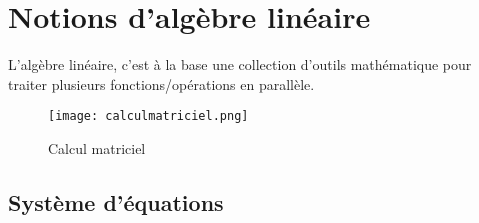 \chapter{Notions d'algèbre linéaire}

L'algèbre linéaire, c'est à la base une collection d'outils mathématique pour traiter plusieurs fonctions/opérations en parallèle.

\begin{figure}[htbp]
	\centering
	\texttt{[image: calculmatriciel.png]}
	\caption{Calcul matriciel }
	\label{fig:calculmatriciel}
\end{figure}


\newpage
\section{Système d’équations}
\label{sec:syseq}

